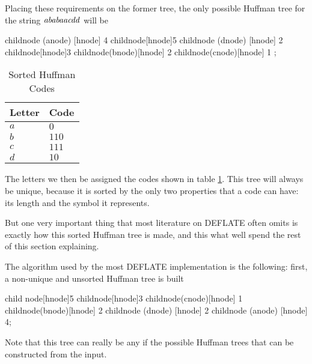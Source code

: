 Placing these requirements on the former tree, the only possible
Huffman tree for the string $\mathit{ababaacdd}$ will be

\begin{huffmanc}
  child{node (anode) [hnode] {4}}
  child{node[hnode]{5}
    child{node (dnode) [hnode] {2}}
    child{node[hnode]{3}
      child{node(bnode)[hnode] {2}}
      child{node(cnode)[hnode] {1}}
    }};

\end{huffmanc}

\begin{table}
  \centering
  \begin{tabular}{ll}
    \toprule
    Letter & Code \\
    \midrule
    $a$ & $0$ \\
    $b$ & $110$ \\
    $c$ & $111$ \\
    $d$ & $10$ \\
    \bottomrule
  \end{tabular}
  \caption{Sorted Huffman Codes}
  \label{tab:huffman-codes-sorted}
\end{table}

The letters we then be assigned the codes shown in table
\ref{tab:huffman-codes-sorted}. This tree will always be unique,
because it is sorted by the only two properties that a code can have:
its length and the symbol it represents.

But one very important thing that most literature on DEFLATE often
omits is exactly how this sorted Huffman tree is made, and this
what well spend the rest of this section explaining.

The algorithm used by the most DEFLATE implementation is the
following: first, a non-unique and unsorted Huffman tree is built

\begin{huffmanc}
  child {node[hnode]{5}
    child{node[hnode]{3}
      child{node(cnode)[hnode] {1}}
      child{node(bnode)[hnode] {2}}}
    child{node (dnode) [hnode] {2}}}
  child{node (anode) [hnode] {4}};

\end{huffmanc}

Note that this tree can really be any if the possible Huffman trees that can
be constructed from the input.

